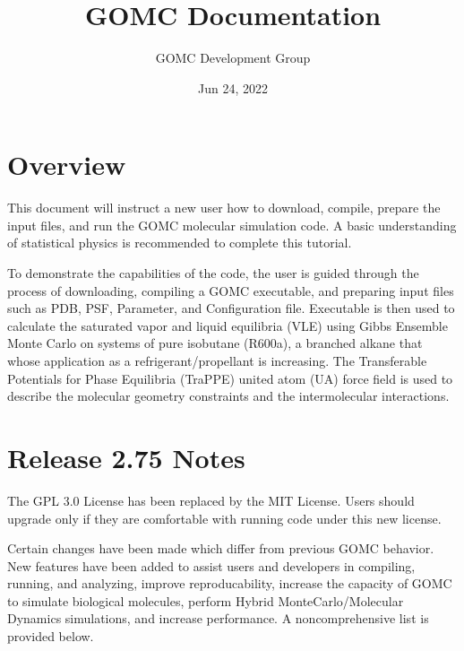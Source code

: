 \documentclass[letterpaper,10pt,english]{sphinxmanual}
\title{GOMC Documentation}
\date{Jun 24, 2022}
\author{GOMC Development Group}
\begin{document}
\pagestyle{empty}
\sphinxmaketitle
\pagestyle{plain}
\sphinxtableofcontents
\pagestyle{normal}
\label{\detokenize{index::doc}}



\chapter{Overview}
\label{\detokenize{overview:overview}}\label{\detokenize{overview::doc}}
\sphinxAtStartPar
This document will instruct a new user how to download, compile, prepare the input files, and run the GOMC molecular simulation code. A basic understanding of statistical physics is recommended to complete this tutorial.

\sphinxAtStartPar
To demonstrate the capabilities of the code, the user is guided through the process of downloading, compiling a GOMC executable, and preparing input files such as PDB, PSF, Parameter, and Configuration file. Executable is then used to calculate the saturated vapor and liquid equilibria (VLE) using Gibbs Ensemble Monte Carlo on systems of pure isobutane (R600a), a branched alkane that whose application as a refrigerant/propellant is increasing. The Transferable Potentials for Phase Equilibria (TraPPE) united atom (UA) force field is used to describe the molecular geometry constraints and the intermolecular interactions.

\sphinxAtStartPar
{}


\chapter{Release 2.75 Notes}
\label{\detokenize{release_notes:release-2-75-notes}}\label{\detokenize{release_notes::doc}}
\sphinxAtStartPar
The GPL 3.0 License has been replaced by the MIT License. Users should upgrade only if they are comfortable with running code under this new license.

\sphinxAtStartPar
Certain changes have been made which differ from previous GOMC behavior.  New features have been added to assist users and developers in compiling, running, and analyzing, improve reproducability, increase the capacity of GOMC to simulate biological molecules, perform Hybrid Monte\sphinxhyphen{}Carlo/Molecular Dynamics simulations, and increase performance.  A non\sphinxhyphen{}comprehensive list is provided below.
\end{document}
